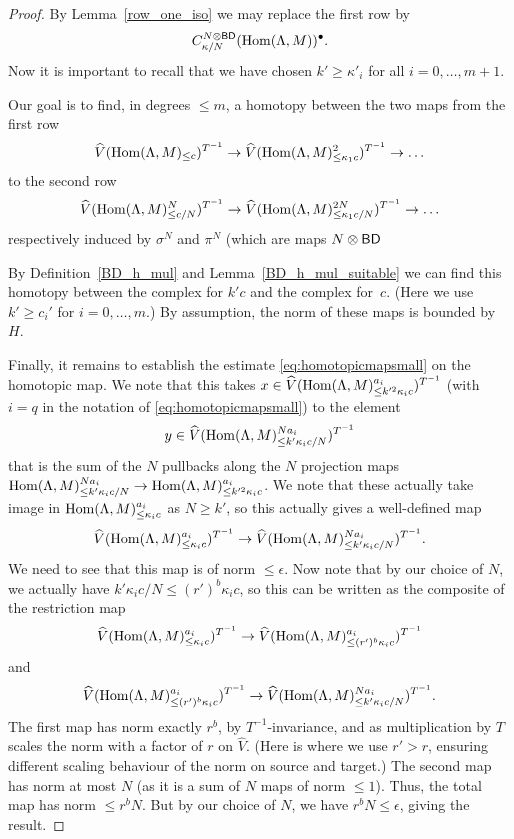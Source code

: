 \begin{proof}
  \leanok
  By Lemma~\ref{row_one_iso} we may replace the first row by
  \[
    C^{N \otimes \mathsf{BD}}_{\kappa/N}(\operatorname{Hom}(\Lambda, M))^\bullet.
  \]
  Now it is important to recall that we have chosen $k' \ge \kappa'_i$ for all $i = 0, \dots, m+1$.

  Our goal is to find,
  in degrees $\leq m$, a homotopy between the two maps from the first row
  \[
    \widehat{V}(\operatorname{Hom}(\Lambda,M)_{\leq c})^{T^{-1}}\to \widehat{V}(\operatorname{Hom}(\Lambda,M)_{\leq \kappa_1c}^2)^{T^{-1}}\to \ldots
  \]
  to the second row
  \[
    \widehat{V}(\operatorname{Hom}(\Lambda,M)_{\leq c/N}^N)^{T^{-1}}\to \widehat{V}(\operatorname{Hom}(\Lambda,M)_{\leq \kappa_1c/N}^{2N})^{T^{-1}}\to \ldots
  \]
  respectively induced by $\sigma^N$ and $\pi^N$ (which are maps $N \otimes \mathsf{BD}$

  By Definition~\ref{BD_h_mul} and Lemma~\ref{BD_h_mul_suitable}
  we can find this homotopy between the complex for $k'c$ and the complex for~$c$.
  (Here we use $k'\geq c_i'$ for $i=0,\ldots,m$.)
  By assumption, the norm of these maps is bounded by~$H$.

  Finally, it remains to establish the estimate \eqref{eq:homotopicmapsmall} on the homotopic map.
  We note that this takes $x\in \widehat{V}(\operatorname{Hom}(\Lambda,M)_{\leq k'^2\kappa_ic}^{a_i})^{T^{-1}}$
  (with $i=q$ in the notation of \eqref{eq:homotopicmapsmall}) to the element
  \[
    y\in \widehat{V}(\operatorname{Hom}(\Lambda,M)_{\leq k'\kappa_ic/N}^{Na_i})^{T^{-1}}
  \]
  that is the sum of the $N$ pullbacks along the $N$ projection maps
  $\operatorname{Hom}(\Lambda,M)_{\leq k'\kappa_ic/N}^{Na_i}\to \operatorname{Hom}(\Lambda,M)_{\leq k'^2\kappa_ic}^{a_i}$.
  We note that these actually take image in $\operatorname{Hom}(\Lambda,M)_{\leq \kappa_ic}^{a_i}$ as $N\geq k'$,
  so this actually gives a well-defined map
  \[
    \widehat{V}(\operatorname{Hom}(\Lambda,M)_{\leq \kappa_ic}^{a_i})^{T^{-1}} \to
    \widehat{V}(\operatorname{Hom}(\Lambda,M)_{\leq k'\kappa_ic/N}^{Na_i})^{T^{-1}}.
  \]
  We need to see that this map is of norm $\leq \epsilon$.
  Now note that by our choice of $N$, we actually have $k'\kappa_ic/N\leq (r')^b \kappa_ic$,
  so this can be written as the composite of the restriction map
  \[
    \widehat{V}(\operatorname{Hom}(\Lambda,M)_{\leq \kappa_ic}^{a_i})^{T^{-1}} \to
    \widehat{V}(\operatorname{Hom}(\Lambda,M)_{\leq (r')^b \kappa_ic}^{a_i})^{T^{-1}}
  \]
  and
  \[
    \widehat{V}(\operatorname{Hom}(\Lambda,M)_{\leq (r')^b \kappa_ic}^{a_i})^{T^{-1}} \to
    \widehat{V}(\operatorname{Hom}(\Lambda,M)_{\leq k'\kappa_ic/N}^{Na_i})^{T^{-1}}.
  \]
  The first map has norm exactly $r^b$, by $T^{-1}$-invariance,
  and as multiplication by $T$ scales the norm with a factor of $r$ on $\widehat{V}$.
  (Here is where we use $r'>r$, ensuring different scaling behaviour of the norm on source and target.)
  The second map has norm at most $N$ (as it is a sum of $N$ maps of norm $\leq 1$).
  Thus, the total map has norm $\leq r^bN$. But by our choice of $N$, we have $r^bN\leq \epsilon$, giving the result.
\end{proof}

